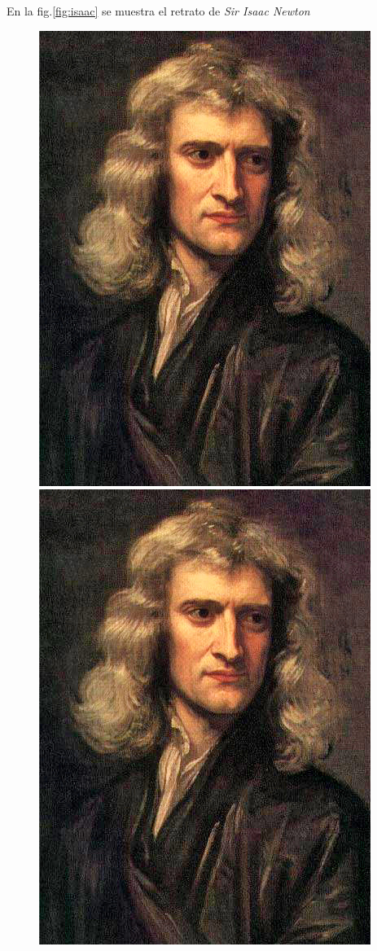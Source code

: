 \documentclass[14pt]{article}
\begin{document}
 
En la fig.\ref{fig:isaac} se muestra el retrato de \textit{Sir Isaac Newton}
 
\begin{figure}[h]
\centering
\includegraphics[scale=0.3]{isaac.png}
\includegraphics[scale=0.2]{isaac.png}

\end{figure}
\end{document}

